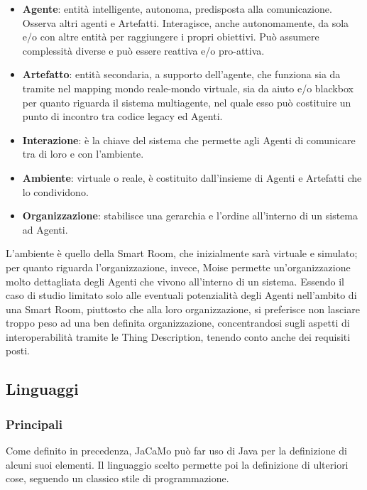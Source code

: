\documentclass[12pt,a4paper,openright,oneside]{report}
\begin{document}
\begin{itemize}
	\item \textbf{Agente}: entità intelligente, autonoma, predisposta alla comunicazione. Osserva altri agenti e Artefatti. Interagisce, anche autonomamente, da sola e/o con altre entità per raggiungere i propri obiettivi. Può assumere complessità diverse e può essere reattiva e/o pro-attiva.
	
	\item \textbf{Artefatto}: entità secondaria, a supporto dell'agente, che funziona sia da tramite nel mapping mondo reale-mondo virtuale, sia da aiuto e/o blackbox per quanto riguarda il sistema multiagente, nel quale esso può costituire un punto di incontro tra codice legacy ed Agenti.
	
	\item \textbf{Interazione}: è la chiave del sistema che permette agli Agenti di comunicare tra di loro e con l'ambiente.
	
	\item \textbf{Ambiente}: virtuale o reale, è costituito dall'insieme di Agenti e Artefatti che lo condividono.
	
	\item \textbf{Organizzazione}: stabilisce una gerarchia e l'ordine all'interno di un sistema ad Agenti.
\end{itemize}

L'ambiente è quello della Smart Room, che inizialmente sarà virtuale e simulato; per quanto riguarda l'organizzazione, invece, Moise permette un'organizzazione molto dettagliata degli Agenti che vivono all'interno di un sistema. Essendo il caso di studio limitato solo alle eventuali potenzialità degli Agenti nell'ambito di una Smart Room, piuttosto che alla loro organizzazione, si preferisce non lasciare troppo peso ad una ben definita organizzazione, concentrandosi sugli aspetti di interoperabilità tramite le Thing Description, tenendo conto anche dei requisiti posti.\\


\subsection{Linguaggi}

\subsubsection{Principali}
Come definito in precedenza, JaCaMo può far uso di Java per la definizione di alcuni suoi elementi. Il linguaggio scelto permette poi la definizione di ulteriori cose, seguendo un classico stile di programmazione.\\
\end{document}
